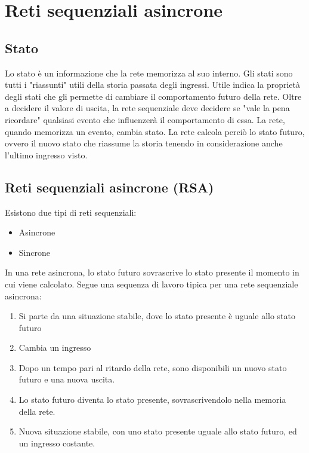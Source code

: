 \documentclass{subfiles}
\begin{document}
\section{Reti sequenziali asincrone}

\subsection{Stato}

Lo stato è un informazione che la rete memorizza al suo interno.
Gli stati sono tutti i "riassunti" utili della storia passata degli ingressi.
Utile indica la proprietà degli stati che gli permette di cambiare il comportamento futuro della rete.
Oltre a decidere il valore di uscita, la rete sequenziale deve decidere se "vale la pena ricordare" qualsiasi evento che influenzerà il comportamento di essa.
La rete, quando memorizza un evento, cambia stato.
La rete calcola perciò lo stato futuro, ovvero il nuovo stato che riassume la storia tenendo in considerazione anche l'ultimo ingresso visto.

\subsection{Reti sequenziali asincrone (RSA)}

Esistono due tipi di reti sequenziali:

\begin{itemize}
    \item Asincrone
    \item Sincrone
\end{itemize}

\noindent
In una rete asincrona, lo stato futuro sovrascrive lo stato presente il momento in cui viene calcolato.
Segue una sequenza di lavoro tipica per una rete sequenziale asincrona:

\begin{enumerate}
    \item Si parte da una situazione stabile, dove lo stato presente è uguale allo stato futuro
    \item Cambia un ingresso
    \item Dopo un tempo pari al ritardo della rete, sono disponibili un nuovo stato futuro e una nuova uscita.
    \item Lo stato futuro diventa lo stato presente, sovrascrivendolo nella memoria della rete.
    \item Nuova situazione stabile, con uno stato presente uguale allo stato futuro, ed un ingresso costante.
\end{enumerate}
\end{document}
